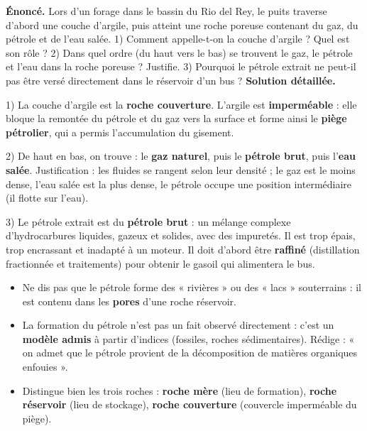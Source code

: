 \documentclass[11pt]{article}
\begin{document}
\begin{exoresolu}
\textbf{Énoncé.} Lors d'un forage dans le bassin du Rio del Rey, le puits traverse d'abord une couche d'argile, puis atteint une roche poreuse contenant du gaz, du pétrole et de l'eau salée. 1) Comment appelle-t-on la couche d'argile ? Quel est son rôle ? 2) Dans quel ordre (du haut vers le bas) se trouvent le gaz, le pétrole et l'eau dans la roche poreuse ? Justifie. 3) Pourquoi le pétrole extrait ne peut-il pas être versé directement dans le réservoir d'un bus ?
\tcblower
\textbf{Solution détaillée.}

1) La couche d'argile est la \textbf{roche couverture}. L'argile est \textbf{imperméable} : elle bloque la remontée du pétrole et du gaz vers la surface et forme ainsi le \textbf{piège pétrolier}, qui a permis l'accumulation du gisement.

2) De haut en bas, on trouve : le \textbf{gaz naturel}, puis le \textbf{pétrole brut}, puis l'\textbf{eau salée}. Justification : les fluides se rangent selon leur densité ; le gaz est le moins dense, l'eau salée est la plus dense, le pétrole occupe une position intermédiaire (il flotte sur l'eau).

3) Le pétrole extrait est du \textbf{pétrole brut} : un mélange complexe d'hydrocarbures liquides, gazeux et solides, avec des impuretés. Il est trop épais, trop encrassant et inadapté à un moteur. Il doit d'abord être \textbf{raffiné} (distillation fractionnée et traitements) pour obtenir le gasoil qui alimentera le bus.
\end{exoresolu}

\begin{attention}
\begin{itemize}
\item Ne dis pas que le pétrole forme des « rivières » ou des « lacs » souterrains : il est contenu dans les \textbf{pores} d'une roche réservoir.
\item La formation du pétrole n'est pas un fait observé directement : c'est un \textbf{modèle admis} à partir d'indices (fossiles, roches sédimentaires). Rédige : « on admet que le pétrole provient de la décomposition de matières organiques enfouies ».
\item Distingue bien les trois roches : \textbf{roche mère} (lieu de formation), \textbf{roche réservoir} (lieu de stockage), \textbf{roche couverture} (couvercle imperméable du piège).
\end{itemize}
\end{attention}
\end{document}
